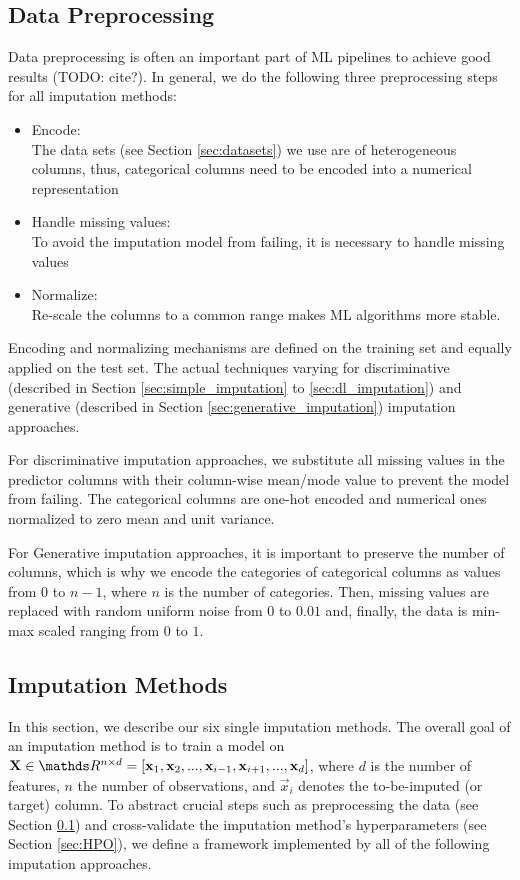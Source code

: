 \subsection{Data Preprocessing}
\label{sec:preprocessing}
%
Data preprocessing is often an important part of ML pipelines to achieve good results (TODO: cite?). In general, we do the following three preprocessing steps for all imputation methods:
%
\begin{itemize}
	\item Encode: \\
		The data sets (see Section \ref{sec:datasets}) we use are of heterogeneous columns, thus, categorical columns need to be encoded into a numerical representation

	\item Handle missing values: \\
		To avoid the imputation model from failing, it is necessary to handle missing values

	\item Normalize: \\
		Re-scale the columns to a common range makes ML algorithms more stable.
\end{itemize}
%
Encoding and normalizing mechanisms are defined on the training set and equally applied on the test set. The actual techniques varying for discriminative (described in Section \ref{sec:simple_imputation} to \ref{sec:dl_imputation}) and generative (described in Section \ref{sec:generative_imputation}) imputation approaches.

For discriminative imputation approaches, we substitute all missing values in the predictor columns with their column-wise mean/mode value to prevent the model from failing. The categorical columns are one-hot encoded and numerical ones normalized to zero mean and unit variance.

For Generative imputation approaches, it is important to preserve the number of columns, which is why we encode the categories of categorical columns as values from $0$ to $n-1$, where $n$ is the number of categories. Then, missing values are replaced with random uniform noise from $0$ to $0.01$ and, finally, the data is min-max scaled ranging from $0$ to $1$.

\subsection{Imputation Methods}
\label{sec:methods:impuation}
%
In this section, we describe our six single imputation methods. The overall goal of an imputation method is to train a model on $\vec{X}\in\R^{n\times d} = [\vec{x}_1, \vec{x}_2, ..., \vec{x}_{i-1}, \vec{x}_{i+1}, ..., \vec{x}_d]$, where $d$ is the number of features, $n$ the number of observations, and $\vec{x}_i$ denotes the to-be-imputed (or target) column.
To abstract crucial steps such as preprocessing the data (see Section \ref{sec:preprocessing}) and cross-validate the imputation method's hyperparameters (see Section \ref{sec:HPO}), we define a framework implemented by all of the following imputation approaches.


